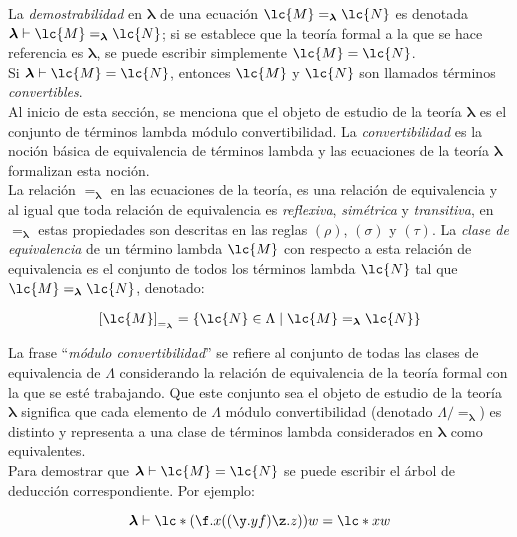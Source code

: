 La \emph{demostrabilidad} en \(\boldsymbol{\lambda}\) de una ecuación
\(\lc{M}=_{\boldsymbol{\lambda}}\lc{N}\) es denotada \(\boldsymbol{\lambda}
\vdash \lc{M}=_{\boldsymbol{\lambda}}\lc{N}\); si se establece que la teoría
formal a la que se hace referencia es \(\boldsymbol{\lambda}\), se puede
escribir simplemente \(\lc{M}=\lc{N}\). \\

Si \(\boldsymbol{\lambda} \vdash \lc{M}=\lc{N}\), entonces \(\lc{M}\) y \(\lc{N}\)
son llamados términos \emph{convertibles}. \\

Al inicio de esta sección, se menciona que el objeto de estudio de la teoría
\(\boldsymbol{\lambda}\) es el conjunto de términos lambda módulo
convertibilidad. La \emph{convertibilidad} es la noción básica de equivalencia
de términos lambda y las ecuaciones de la teoría \(\boldsymbol{\lambda}\)
formalizan esta noción. \\

La relación \(=_{\boldsymbol{\lambda}}\) en las ecuaciones de la teoría, es una
relación de equivalencia y al igual que toda relación de equivalencia es
\emph{reflexiva}, \emph{simétrica} y \emph{transitiva}, en
\(=_{\boldsymbol{\lambda}}\) estas propiedades son descritas en las reglas
\((\rho)\), \((\sigma)\) y \((\tau)\). La \emph{clase de equivalencia} de un
término lambda \(\lc{M}\) con respecto a esta relación de equivalencia es el
conjunto de todos los términos lambda \(\lc{N}\) tal que
\(\lc{M}=_{\boldsymbol{\lambda}}\lc{N}\), denotado:

\[\left[ \lc{M} \right]_{=_{\boldsymbol{\lambda}}} = \left\{ \lc{N} \in \Lambda
    \mid \lc{M}=_{\boldsymbol{\lambda}}\lc{N} \right\}\]

La frase ``\emph{módulo convertibilidad}'' se refiere al conjunto de todas las
clases de equivalencia de \(\Lambda\) considerando la relación de equivalencia
de la teoría formal con la que se esté trabajando. Que este conjunto sea el
objeto de estudio de la teoría \(\boldsymbol{\lambda}\) significa que cada
elemento de \(\Lambda\) módulo convertibilidad (denotado \(\Lambda /
=_{\boldsymbol{\lambda}}\)) es distinto y representa a una clase de
términos lambda considerados en \(\boldsymbol{\lambda}\) como equivalentes. \\

Para demostrar que \(\boldsymbol{\lambda} \vdash \lc{M}=\lc{N}\) se puede
escribir el árbol de deducción correspondiente. Por ejemplo:

\[\boldsymbol{\lambda} \vdash \lc*{(\f.x((\y.y f) \z.z))w} = \lc*{x w}\]

